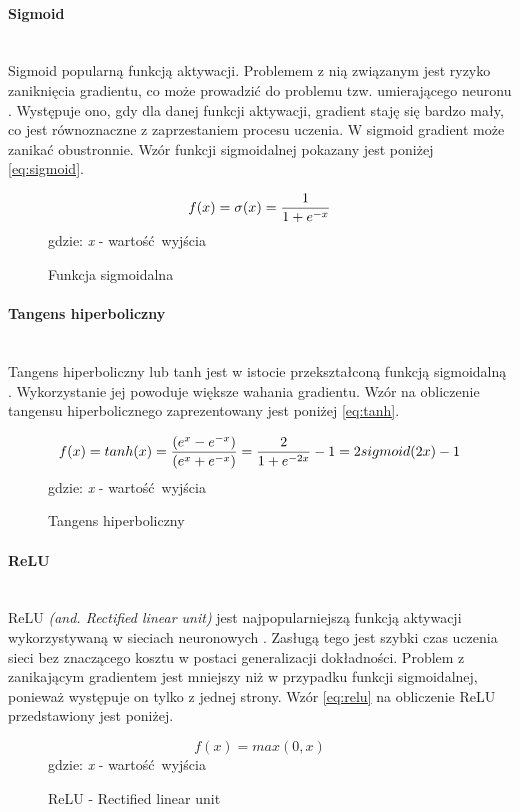 \paragraph{Sigmoid} \mbox{}\\
Sigmoid popularną funkcją aktywacji. Problemem z nią związanym
jest ryzyko zaniknięcia gradientu, co może prowadzić do problemu tzw. umierającego
neuronu \cite{activationFunctions}. Występuje ono, gdy dla danej funkcji aktywacji,
gradient staję się bardzo mały, co jest równoznaczne z zaprzestaniem procesu uczenia.
W sigmoid gradient może zanikać obustronnie. Wzór funkcji sigmoidalnej pokazany jest poniżej \ref{eq:sigmoid}.
\begin{figure}[h!]
\renewcommand{\figurename}{Wzór}%
\begin{equation} \label{eq:sigmoid}
f(x) = \sigma(x) = \frac{1}{1 + e^{-x}} \\
\end{equation}
\centering
gdzie: \textit{x} - wartość wyjścia
\caption{Funkcja sigmoidalna}
\end{figure}

\paragraph{Tangens hiperboliczny} \mbox{}\\
Tangens hiperboliczny lub tanh jest w istocie przekształconą funkcją sigmoidalną
\cite{activationFunctions, activationFunctionsV2}. Wykorzystanie
jej powoduje większe wahania gradientu. Wzór na obliczenie tangensu hiperbolicznego
zaprezentowany jest poniżej \ref{eq:tanh}.
\begin{figure}[h!]
\renewcommand{\figurename}{Wzór}%
\begin{equation} \label{eq:tanh}
f(x) = tanh(x) = \frac{(e^x - e^{-x})}{(e^x + e^{-x})} = \frac{2}{1+e^{-2x}} - 1 = 2 sigmoid(2x) - 1\\
\end{equation}
\centering
gdzie: \textit{x} - wartość wyjścia
\caption{Tangens hiperboliczny}
\end{figure}

\paragraph{ReLU} \mbox{}\\
ReLU \textit{(and. Rectified linear unit)} jest najpopularniejszą funkcją
aktywacji wykorzystywaną w sieciach neuronowych \cite{CS231n_activ, WIKIrectifier}.
Zasługą tego jest szybki czas uczenia sieci bez znaczącego kosztu w postaci generalizacji
dokładności. Problem z zanikającym gradientem jest mniejszy niż w przypadku funkcji
sigmoidalnej, ponieważ występuje on tylko z jednej strony.
Wzór \ref{eq:relu} na obliczenie ReLU przedstawiony jest poniżej.
\begin{figure}[h!]
\renewcommand{\figurename}{Wzór}%
\begin{equation} \label{eq:relu}
f(x) = max(0, x)
\end{equation}
\centering
gdzie: \textit{x} - wartość wyjścia
\caption{ReLU - Rectified linear unit}
\end{figure}

